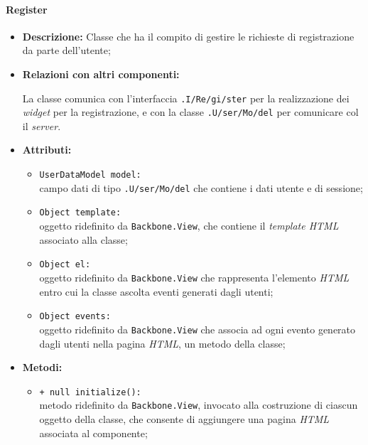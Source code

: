 \paragraph{Register}
\label{register}
\begin{flushleft}
\begin{itemize}
\item \textbf{Descrizione:} Classe che ha il compito di gestire le richieste di registrazione da parte dell'utente;
\item \textbf{Relazioni con altri componenti:}
\begin{sloppypar}
La classe comunica con l'interfaccia \texttt{\viewUser{}.I\fshyp{}Re\fshyp{}gi\fshyp{}ster} per la realizzazione dei \textit{widget} per la registrazione, e con la classe \texttt{\model{}.U\fshyp{}ser\fshyp{}Mo\fshyp{}del} per comunicare col il \textit{server}.
\end{sloppypar}
\item \textbf{Attributi:}
\begin{sloppypar}
\begin{itemize}
\item \texttt{UserDataModel model:}\\ campo dati di tipo \texttt{\model{}.U\fshyp{}ser\fshyp{}Mo\fshyp{}del} che contiene i dati utente e di sessione;
\item \texttt{Object template:}\\ oggetto ridefinito da \texttt{Backbone.View}, che contiene il \textit{template HTML} associato alla classe;
\item \texttt{Object el:}\\ oggetto ridefinito da \texttt{Backbone.View} che rappresenta l'elemento \textit{HTML} entro cui la classe ascolta eventi generati dagli utenti;
\item \texttt{Object events:}\\ oggetto ridefinito da \texttt{Backbone.View} che associa ad ogni evento generato dagli utenti nella pagina \textit{HTML}, un metodo della classe;
\end{itemize}
\end{sloppypar}
\item \textbf{Metodi:}
\begin{sloppypar}
\begin{itemize}
\item \texttt{+ null initialize():}\\ metodo ridefinito da \texttt{Backbone.View}, invocato alla costruzione di ciascun oggetto della classe, che consente di aggiungere una pagina \textit{HTML} associata al componente;

\end{itemize}
\end{sloppypar}
\end{itemize}
\end{flushleft}
